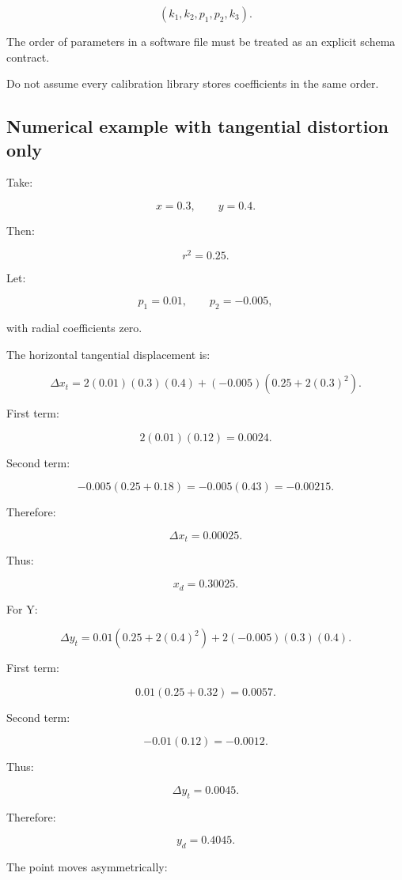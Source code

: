 \[
 \boxed{ (k_1,k_2,p_1,p_2,k_3) }.
\]

The order of parameters in a software file must be treated as an explicit schema contract.

Do not assume every calibration library stores coefficients in the same order.

\subsection{Numerical example with tangential distortion only}\label{02-foundations-ii-ch035-numerical-example-with-tangential-distortion-only}

\hypertarget{02-foundations-ii-ch035-numerical-example-with-tangential-distortion-only}{}

Take:

\[
 x=0.3,\qquad y=0.4.
\]

Then:

\[
 r^2=0.25.
\]

Let:

\[
 p_1=0.01,\qquad p_2=-0.005,
\]

with radial coefficients zero.

The horizontal tangential displacement is:

\[
 \Delta x_t= 2(0.01)(0.3)(0.4) +(-0.005)(0.25+2(0.3)^2).
\]

First term:

\[
 2(0.01)(0.12)=0.0024.
\]

Second term:

\[
 -0.005(0.25+0.18) =-0.005(0.43) =-0.00215.
\]

Therefore:

\[
 \boxed{ \Delta x_t=0.00025 }.
\]

Thus:

\[
 \boxed{x_d=0.30025}.
\]

For Y:

\[
 \Delta y_t= 0.01(0.25+2(0.4)^2) +2(-0.005)(0.3)(0.4).
\]

First term:

\[
 0.01(0.25+0.32)=0.0057.
\]

Second term:

\[
 -0.01(0.12)=-0.0012.
\]

Thus:

\[
 \boxed{ \Delta y_t=0.0045 }.
\]

Therefore:

\[
 \boxed{y_d=0.4045}.
\]

The point moves asymmetrically:

